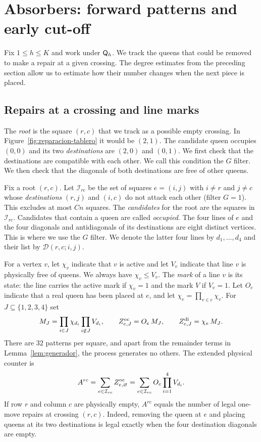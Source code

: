 \section{Absorbers: forward patterns and early cut-off}\label{sec:absorbedores}

Fix $1\le h\le K$ and work under $\mathsf{Q}_h$. We track the queens that could be removed to make a repair at a
given crossing. The degree
estimates from the preceding section allow us to estimate how their number changes when the next piece is
placed.

\subsection{Repairs at a crossing and line marks}

The \emph{root} is the square $(r,c)$ that we track as a possible empty crossing. In
Figure~\ref{fig:reparacion-tablero} it would be
$(2,1)$. The candidate queen occupies $(0,0)$ and its two \emph{destinations} are $(2,0)$ and $(0,1)$. We
first check that the destinations are
compatible with each other. We call this condition the $G$ filter. We then check that the diagonals of both
destinations are free of other
queens.

Fix a root $(r,c)$. Let $\mathcal I_{rc}$ be the set of squares $e=(i,j)$ with $i\ne r$ and $j\ne c$ whose
\emph{destinations} $(r,j)$ and
$(i,c)$ do not attack each other (filter $G=1$). This excludes at most $Cn$ squares. The \emph{candidates}
for the root are the
squares in $\mathcal I_{rc}$. Candidates that contain a queen are called \emph{occupied}. The four lines of
$e$ and the four diagonals
and antidiagonals of its destinations are eight distinct vertices. This is where we use the $G$ filter. We
denote the latter four lines by
$d_1,\dots,d_4$ and their list by $\mathcal D(r,c;i,j)$.

For a vertex $v$, let $\chi_v$ indicate that $v$ is active and let $V_v$ indicate that line $v$ is
physically free of queens. We always
have $\chi_v\le V_v$. The \emph{mark} of a line $v$ is its state: the line carries the active mark if
$\chi_v=1$ and the mark $V$ if $V_v=1$. Let
$O_e$ indicate that a real queen has been placed at $e$, and let $\chi_e=\prod_{v\in e}\chi_v$. For
$J\subseteq\{1,2,3,4\}$ set
\begin{equation}\label{eq:patrones}
 M_J=\prod_{i\in J}\chi_{d_i}\prod_{i\notin J}V_{d_i},\qquad
 Z^{\mathrm{oc}}_{e,J}=O_e\,M_J,\qquad Z^{\mathrm{di}}_{e,J}=\chi_e\,M_J .
\end{equation} There are $32$ patterns per square, and apart from the remainder terms in
Lemma~\ref{lem:generador}, the process
generates no others. The extended physical counter is \[
 A^{rc}=\sum_{e\in\mathcal I_{rc}}Z^{\mathrm{oc}}_{e,\varnothing}=\sum_{e\in\mathcal I_{rc}}O_e\prod_{i=1}^4V_{d_i}.
\] If row $r$ and column $c$ are physically empty, $A^{rc}$ equals the number of legal one-move repairs at
crossing $(r,c)$. Indeed,
removing the queen at $e$ and placing queens at its two destinations is legal exactly when the four
destination diagonals are empty.

